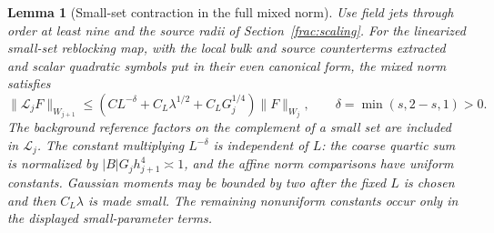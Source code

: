 \documentclass[11pt]{article}
\newtheorem{lemma}[proposition]{Lemma}
\begin{document}
\begin{lemma}[Small-set contraction in the full mixed norm]
\label{completion:smallset}
Use field jets through order at least nine and the source radii of
Section~\ref{frac:scaling}. For the linearized
small-set reblocking map, with the local bulk and source counterterms
extracted and scalar quadratic symbols put in their even canonical
form, the mixed norm satisfies
\[
 \|\mathcal L_jF\|_{W_{j+1}}
 \le \left(CL^{-\delta}+C_L\lambda^{1/2}
                         +C_LG_j^{1/4}\right)\|F\|_{W_j},
 \qquad \delta=\min(s,2-s,1)>0.
\]
The background reference factors on the complement of a small set are
included in \(\mathcal L_j\). The constant multiplying \(L^{-\delta}\)
is independent of \(L\): the coarse quartic sum is normalized by
\(|B|G_jh_{j+1}^4\asymp1\), and the affine norm comparisons have uniform
constants. Gaussian moments may be bounded by two after the fixed
\(L\) is chosen and then \(C_L\lambda\) is made small. The remaining
nonuniform constants occur only in the displayed small-parameter terms.
\end{lemma}
\end{document}

